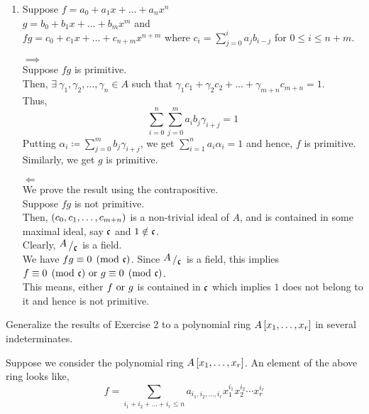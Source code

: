 \begin{enumerate}
	\item
	Suppose \( f = a_0 + a_1 x + \ldots + a_n x^n \) \\
	\( g = b_0 + b_1 x + \ldots + b_m x^m \) and \\
	\( fg = c_0 + c_1 x + \ldots + c_{n+m} x^{n+m} \) where
	\( c_i = \sum_{j=0}^i a_j b_{i-j} \) for \( 0 \leq i \leq n+m \).

	\( \implies \) \\
	Suppose \( fg \) is primitive. \\
	Then, \( \exists\ \gamma_1, \gamma_2, \ldots, \gamma_n \in A \)
	such that \( \gamma_1 c_1 + \gamma_2 c_2 + \ldots +
	\gamma_{m+n} c_{m+n}  = 1 \). \\
	Thus,
	\[ \sum_{i=0}^n \sum_{j=0}^m a_i b_j \gamma_{i+j} = 1 \]
	Putting \( \alpha_i \coloneqq \sum_{j=0}^m b_j \gamma_{i+j} \),
	we get \( \sum_{i=1}^n a_i \alpha_i = 1 \) and hence,
	\( f \) is primitive. \\
	Similarly, we get \( g \) is primitive.

	\( \Longleftarrow \) \\
	We prove the result using the contrapositive. \\
	Suppose \( fg \) is not primitive. \\
	Then, \( \left( c_0, c_1, \ldots, c_{m+n} \right) \) is a non-trivial
	ideal of \( A \), and is contained in some maximal ideal,
	say \( \mathfrak{c} \) and \( 1 \notin \mathfrak{c} \). \\
	Clearly, \( \bigslant{A}{\mfc} \) is a field. \\
	We have \( fg \equiv 0 \pmod{\mathfrak{c}} \).
	Since \( \bigslant{A}{\mfc} \) is a field, this implies
	\( f \equiv 0 \pmod{\mathfrak{c}} \text{ or } g \equiv 0 \pmod{\mathfrak{c}} \). \\
	This means, either \( f \text{ or } g \) is contained in \( \mathfrak{c} \) which implies
	\( 1 \) does not belong to it and hence is not primitive.
\end{enumerate}


\begin{exercise}{}{}
	Generalize the results of Exercise 2 to a polynomial ring
	\( A \left[ x_1, \ldots, x_r \right] \) in several indeterminates.
\end{exercise}

Suppose we consider the polynomial ring \( A \left[ x_1, \ldots, x_r \right] \).
An element of the above ring looks like,
\[
	f = \sum_{i_1 + i_2 + \ldots + i_r \leq n}
	a_{i_1, i_2, \ldots, i_r} x_1^{i_1} x_2^{i_2} \cdots x_r^{i_r}
\]

